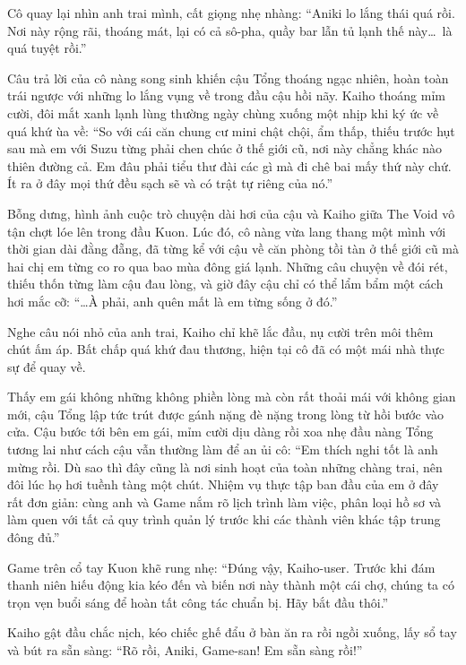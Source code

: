 \documentclass[../main.tex]{subfiles}
\begin{document}
Cô quay lại nhìn anh trai mình, cất giọng nhẹ nhàng: ``Aniki lo lắng thái quá rồi. Nơi này rộng rãi, thoáng mát, lại có cả sô-pha, quầy bar lẫn tủ lạnh thế này\dots\ là quá tuyệt rồi.''

Câu trả lời của cô nàng song sinh khiến cậu Tổng thoáng ngạc nhiên, hoàn toàn trái ngược với những lo lắng vụng về trong đầu cậu hồi nãy. Kaiho thoáng mỉm cười, đôi mắt xanh lạnh lùng thường ngày chùng xuống một nhịp khi ký ức về quá khứ ùa về: ``So với cái căn chung cư mini chật chội, ẩm thấp, thiếu trước hụt sau mà em với Suzu từng phải chen chúc ở thế giới cũ, nơi này chẳng khác nào thiên đường cả. Em đâu phải tiểu thư đài các gì mà đi chê bai mấy thứ này chứ. Ít ra ở đây mọi thứ đều sạch sẽ và có trật tự riêng của nó.''

Bỗng dưng, hình ảnh cuộc trò chuyện dài hơi của cậu và Kaiho giữa The Void vô tận chợt lóe lên trong đầu Kuon. Lúc đó, cô nàng vừa lang thang một mình với thời gian dài đằng đẵng, đã từng kể với cậu về căn phòng tồi tàn ở thế giới cũ mà hai chị em từng co ro qua bao mùa đông giá lạnh. Những câu chuyện về đói rét, thiếu thốn từng làm cậu đau lòng, và giờ đây cậu chỉ có thể lẩm bẩm một cách hơi mắc cỡ: ``\dots À phải, anh quên mất là em từng sống ở đó.''

Nghe câu nói nhỏ của anh trai, Kaiho chỉ khẽ lắc đầu, nụ cười trên môi thêm chút ấm áp. Bất chấp quá khứ đau thương, hiện tại cô đã có một mái nhà thực sự để quay về.

Thấy em gái không những không phiền lòng mà còn rất thoải mái với không gian mới, cậu Tổng lập tức trút được gánh nặng đè nặng trong lòng từ hồi bước vào cửa. Cậu bước tới bên em gái, mỉm cười dịu dàng rồi xoa nhẹ đầu nàng Tổng tương lai như cách cậu vẫn thường làm để an ủi cô: ``Em thích nghi tốt là anh mừng rồi. Dù sao thì đây cũng là nơi sinh hoạt của toàn những chàng trai, nên đôi lúc họ hơi tuềnh tàng một chút. Nhiệm vụ thực tập ban đầu của em ở đây rất đơn giản: cùng anh và Game nắm rõ lịch trình làm việc, phân loại hồ sơ và làm quen với tất cả quy trình quản lý trước khi các thành viên khác tập trung đông đủ.''

Game trên cổ tay Kuon khẽ rung nhẹ:  ``Đúng vậy, Kaiho-user. Trước khi đám thanh niên hiếu động kia kéo đến và biến nơi này thành một cái chợ, chúng ta có trọn vẹn buổi sáng để hoàn tất công tác chuẩn bị. Hãy bắt đầu thôi.''

Kaiho gật đầu chắc nịch, kéo chiếc ghế đẩu ở bàn ăn ra rồi ngồi xuống, lấy sổ tay và bút ra sẵn sàng: ``Rõ rồi, Aniki, Game-san! Em sẵn sàng rồi!''
\end{document}
